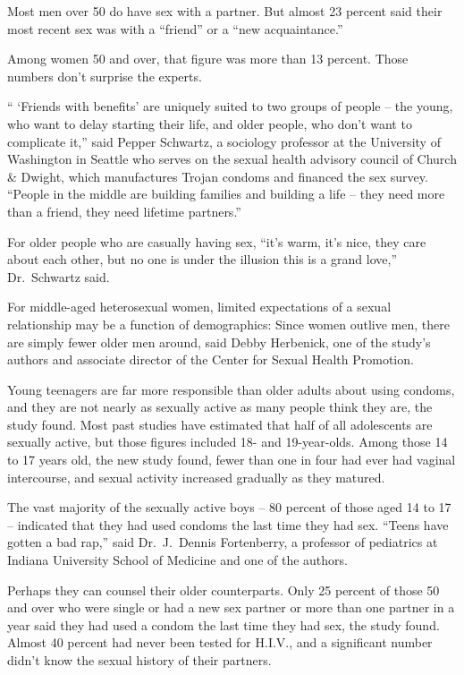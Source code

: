 ﻿\documentclass[12pt]{article}
\begin{document}
Most men over 50 do have sex with a partner. But almost 23 percent said their most recent sex was
with a ``friend'' or a ``new acquaintance.''

Among women 50 and over, that figure was more than 13 percent. Those numbers don't surprise the
experts.

`` `Friends with benefits' are uniquely suited to two groups of people -- the young, who want to
delay starting their life, and older people, who don't want to complicate it,'' said Pepper
Schwartz, a sociology professor at the University of Washington in Seattle who serves on the sexual
health advisory council of Church \& Dwight, which manufactures Trojan condoms and financed the sex
survey. ``People in the middle are building families and building a life -- they need more than a
friend, they need lifetime partners.''

For older people who are casually having sex, ``it's warm, it's nice, they care about each other,
but no one is under the illusion this is a grand love,'' Dr.~Schwartz said.

For middle-aged heterosexual women, limited expectations of a sexual relationship may be a function
of demographics: Since women outlive men, there are simply fewer older men around, said Debby
Herbenick, one of the study's authors and associate director of the Center for Sexual Health
Promotion.

Young teenagers are far more responsible than older adults about using condoms, and they are not
nearly as sexually active as many people think they are, the study found. Most past studies have
estimated that half of all adolescents are sexually active, but those figures included 18- and
19-year-olds. Among those 14 to 17 years old, the new study found, fewer than one in four had ever
had vaginal intercourse, and sexual activity increased gradually as they matured.

The vast majority of the sexually active boys -- 80 percent of those aged 14 to 17 -- indicated that
they had used condoms the last time they had sex. ``Teens have gotten a bad rap,'' said
Dr.~J.~Dennis Fortenberry, a professor of pediatrics at Indiana University School of Medicine and
one of the authors.

Perhaps they can counsel their older counterparts. Only 25 percent of those 50 and over who were
single or had a new sex partner or more than one partner in a year said they had used a condom the
last time they had sex, the study found. Almost 40 percent had never been tested for H.I.V., and a
significant number didn't know the sexual history of their partners.
\end{document}
